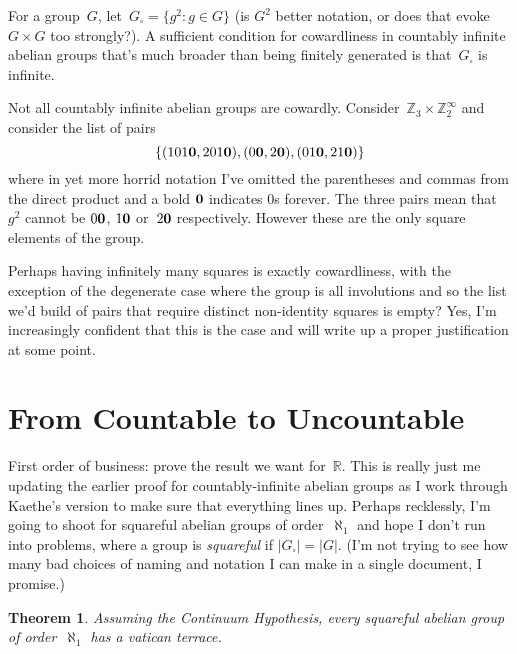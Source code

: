 \documentclass[a4paper,12pt]{article}
\newtheorem{thm}{Theorem}
\newcommand{\Z}{\mathbb{Z}}
\newcommand{\R}{\mathbb{R}}
\begin{document}
For a group~$G$, let~$G_{\square} = \{ g^2 : g \in G \}$ (is $G^2$ better notation, or does that evoke~$G \times G$ too strongly?).  A sufficient condition for cowardliness in countably infinite abelian groups that's much broader than being finitely generated is that~$G_{\square}$ is infinite.

Not all countably infinite abelian groups are cowardly.  Consider~$\Z_3 \times \Z_2^{\infty}$ and consider the list of pairs
$$\{ (101{\bf 0}, 201{\bf 0}), (0{\bf 0}, 2{\bf 0}), (01{\bf 0},21{\bf 0})   \}$$ 
where in yet more horrid notation I've omitted the parentheses and commas from the direct product and a bold ${\bf 0}$ indicates 0s forever.  The three pairs mean that~$g^2$ cannot be $0{\bf 0}$, $1{\bf 0}$ or~$2{\bf 0}$ respectively.  However these are the only square elements of the group.

Perhaps having infinitely many squares is exactly cowardliness, with the exception of the degenerate case where the group is all involutions and so the list we'd build of pairs that require distinct non-identity squares is empty?  Yes, I'm increasingly confident that this is the case and will write up a proper justification at some point.

\section{From Countable to Uncountable}

First order of business: prove the result we want for~$\R$.  This is really just me updating the earlier proof for countably-infinite abelian groups as I work through Kaethe's version to make sure that everything lines up.   Perhaps recklessly, I'm going to shoot for squareful abelian groups of order~$\aleph_1$ and hope I don't run into problems, where a group is {\em squareful} if $|G_{\square}| = |G|$.  (I'm not trying to see how many bad choices of naming and notation I can make in a single document, I promise.)


\begin{thm}\label{th:saba1}
Assuming the Continuum Hypothesis,
every squareful abelian group of order~$\aleph_1$ has a vatican terrace.
\end{thm}
\end{document}
